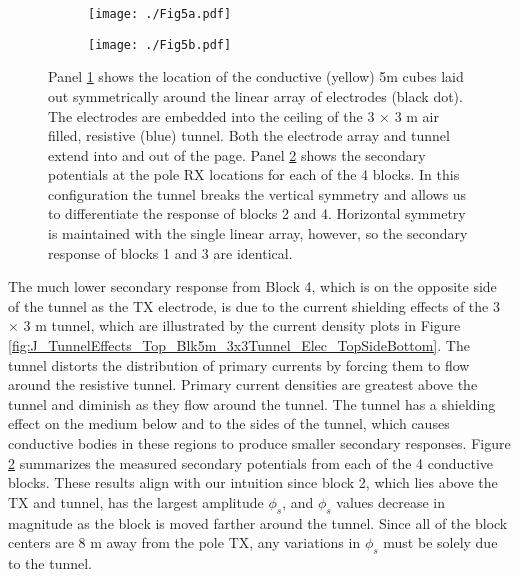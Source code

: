 \documentclass[preprint,authoryear,12pt]{elsarticle}
\begin{document}
\begin{figure}[htp]
   \begin{center}
      \begin{subfigure}{0.4\linewidth}
         \texttt{[image: ./Fig5a.pdf]}
         \caption{}
         \label{fig:4Blocks_Tunnel_Model}
      \end{subfigure}
      \hfill
      \begin{subfigure}{0.59\linewidth}
         \texttt{[image: ./Fig5b.pdf]}
         \caption{}
         \label{fig:4Blocks_Tunnel_Vs}
      \end{subfigure}
   \end{center}
\caption{Panel \ref{fig:4Blocks_Tunnel_Model} shows the location of the conductive (yellow) 5m cubes laid out symmetrically around the linear array of electrodes (black dot). The electrodes are embedded into the ceiling of the 3 $\times$ 3 m air filled, resistive (blue) tunnel. Both the electrode array and tunnel extend into and out of the page. Panel \ref{fig:4Blocks_Tunnel_Vs} shows the secondary potentials at the pole RX locations for each of the 4 blocks. In this configuration the tunnel breaks the vertical symmetry and allows us to differentiate the response of blocks 2 and 4. Horizontal symmetry is maintained with the single linear array, however, so the secondary response of blocks 1 and 3 are identical.}
\label{fig:4Blocks_Tunnel}
\end{figure}

The much lower secondary response from Block 4, which is on the opposite side of the tunnel as the TX electrode, is due to the current shielding effects of the 3 $\times$ 3 m tunnel, which are illustrated by the current density plots in Figure \ref{fig:J_TunnelEffects_Top_Blk5m_3x3Tunnel_Elec_TopSideBottom}. The tunnel distorts the distribution of primary currents by forcing them to flow around the resistive tunnel. Primary current densities are greatest above the tunnel and diminish as they flow around the tunnel. The tunnel has a shielding effect on the medium below and to the sides of the tunnel, which causes conductive bodies in these regions to produce smaller secondary responses. Figure \ref{fig:4Blocks_Tunnel_Vs} summarizes the measured secondary potentials from each of the 4 conductive blocks. These results align with our intuition since block 2, which lies above the TX and tunnel, has the largest amplitude $\phi_{s}$, and $\phi_{s}$ values decrease in magnitude as the block is moved farther around the tunnel. Since all of the block centers are 8 m away from the pole TX, any variations in $\phi_{s}$ must be solely due to the tunnel.
\end{document}
